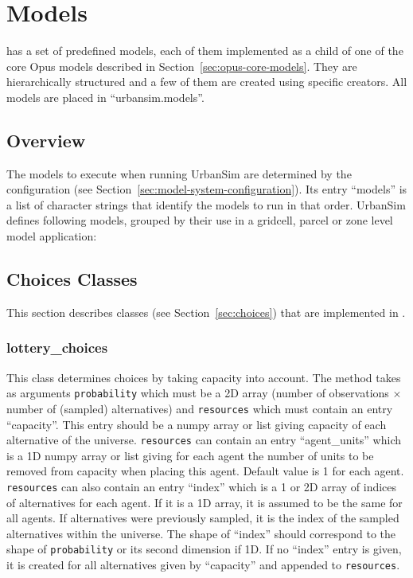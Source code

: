 \section{Models}
\label{sec:urbansim-models}
\modelsindex

 has a set of predefined models, each
of them implemented as a child of one of the core Opus models
\modelsindex described in Section~\ref{sec:opus-core-models}.  They
are hierarchically structured and a few of them are created using
specific creators.  All
 models are placed in
``urbansim.models''.


\subsection{Overview}

The models to execute when running UrbanSim are determined by the configuration
(see Section~\ref{sec:model-system-configuration}). Its entry ``models'' is a
list of character strings that identify the models to run in that order.
UrbanSim defines following models, grouped by their use in a gridcell, parcel or zone level model
application: 



%
\subsection{Choices Classes}
%
\label{sec:urbansim-choices}
This section describes  classes (see
Section~\ref{sec:choices}) that are implemented in .

\subsubsection{lottery_choices}
%
This class determines choices by taking capacity into account. The
 method takes as arguments \verb|probability| which must be a 2D
array (number of observations $\times$ number of (sampled) alternatives) and
\verb|resources| which must contain an entry ``capacity''. This entry should
be a numpy array \numpyindex or list giving capacity of each alternative of the universe.
\verb|resources| can contain an entry ``agent_units'' which is a 1D numpy array \numpyindex
or list giving for each agent the number of units to be removed from capacity
when placing this agent. Default value is 1 for each agent.  \verb|resources|
can also contain an entry ``index'' which is a 1 or 2D array of indices of
alternatives for each agent. If it is a 1D array, it is assumed to be the same
for all agents. If alternatives were previously sampled, it is the index of
the sampled alternatives within the universe. The shape of ``index'' should
correspond to the shape of \verb|probability| or its second dimension if 1D.
If no ``index'' entry is given, it is created for all alternatives given by
``capacity'' and appended to \verb|resources|.

